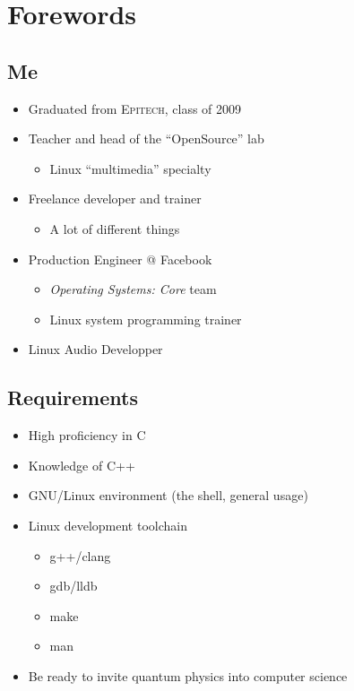 \section*{Forewords}
\label{sec:forewords}

\subsection*{Me}
\begin{frame}
  \begin{itemize}
  \item Graduated from \textsc{Epitech}, class of 2009
  \item Teacher and head of the ``OpenSource'' lab
    \begin{itemize}
    \item Linux ``multimedia'' specialty
    \end{itemize}
  \item Freelance developer and trainer
    \begin{itemize}
    \item A lot of different things
    \end{itemize}
  \item Production Engineer @ Facebook
    \begin{itemize}
    \item \emph{Operating Systems: Core} team
    \item Linux system programming trainer
    \end{itemize}
  \item Linux Audio Developper
  \end{itemize}
\end{frame}


\subsection*{Requirements}
\begin{frame}
  \begin{itemize}
  \item High proficiency in C
  \item Knowledge of C++
  \item GNU/Linux environment (the shell, general usage)
  \item Linux development toolchain
    \begin{itemize}
    \item g++/clang
    \item gdb/lldb
    \item make
    \item man
    \end{itemize}
  \item Be ready to invite quantum physics into computer science
  \end{itemize}
\end{frame}


